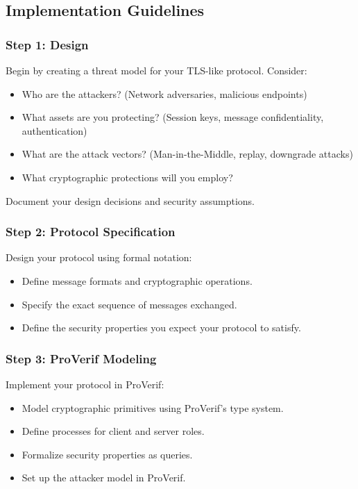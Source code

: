 \documentclass[10pt,a4paper,american]{article}
\begin{document}
\subsection*{Implementation Guidelines}

\subsubsection*{Step 1: Design}
Begin by creating a threat model for your TLS-like protocol. Consider:
\begin{itemize}
	\item Who are the attackers? (Network adversaries, malicious endpoints)
	\item What assets are you protecting? (Session keys, message confidentiality, authentication)
	\item What are the attack vectors? (Man-in-the-Middle, replay, downgrade attacks)
	\item What cryptographic protections will you employ?
\end{itemize}

Document your design decisions and security assumptions.

\subsubsection*{Step 2: Protocol Specification}
Design your protocol using formal notation:
\begin{itemize}
	\item Define message formats and cryptographic operations.
	\item Specify the exact sequence of messages exchanged.
	\item Define the security properties you expect your protocol to satisfy.
\end{itemize}

\subsubsection*{Step 3: ProVerif Modeling}
Implement your protocol in ProVerif:
\begin{itemize}
	\item Model cryptographic primitives using ProVerif's type system.
	\item Define processes for client and server roles.
	\item Formalize security properties as queries.
	\item Set up the attacker model in ProVerif.
\end{itemize}
\end{document}
